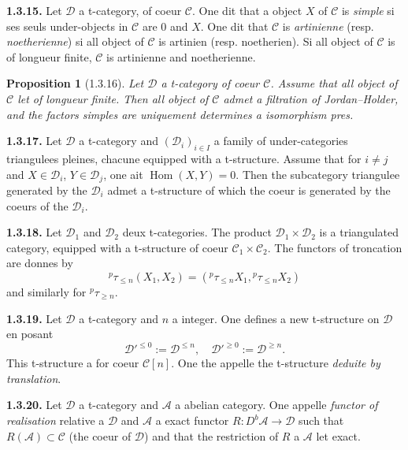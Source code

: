 \documentclass[12pt,a4paper]{article}
\theoremstyle{plain}
\newtheorem{proposition}[theorem]{Proposition}
\theoremstyle{definition}
\theoremstyle{remark}
\DeclareMathOperator{\Hom}{Hom}
\newcommand{\cA}{\mathcal{A}}
\newcommand{\cC}{\mathcal{C}}
\newcommand{\cD}{\mathcal{D}}
\begin{document}
\smallskip

\noindent
\textbf{1.3.15.} Let $\cD$ a t-category, of coeur $\cC$. One dit that a object $X$ of $\cC$ is \emph{simple} si ses seuls under-objects in $\cC$ are $0$ and $X$. One dit that $\cC$ is \emph{artinienne} (resp. \emph{noetherienne}) si all object of $\cC$ is artinien (resp. noetherien). Si all object of $\cC$ is of longueur finite, $\cC$ is artinienne and noetherienne.

\smallskip

\begin{proposition}[1.3.16]
Let $\cD$ a t-category of coeur $\cC$. Assume that all object of $\cC$ let of longueur finite. Then all object of $\cC$ admet a filtration of Jordan--Holder, and the factors simples are uniquement determines a isomorphism pres.
\end{proposition}

\smallskip

\noindent
\textbf{1.3.17.} Let $\cD$ a t-category and $(\cD_{i})_{i \in I}$ a family of under-categories triangulees pleines, chacune equipped with a t-structure. Assume that for $i \neq j$ and $X \in \cD_{i}$, $Y \in \cD_{j}$, one ait $\Hom(X, Y) = 0$. Then the subcategory triangulee generated by the $\cD_{i}$ admet a t-structure of which the coeur is generated by the coeurs of the $\cD_{i}$.

\smallskip

\noindent
\textbf{1.3.18.} Let $\cD_{1}$ and $\cD_{2}$ deux t-categories. The product $\cD_{1} \times \cD_{2}$ is a triangulated category, equipped with a t-structure of coeur $\cC_{1} \times \cC_{2}$. The functors of troncation are donnes by
\[
{}^{p}\tau_{\leq n}(X_{1}, X_{2}) = ({}^{p}\tau_{\leq n}X_{1}, {}^{p}\tau_{\leq n}X_{2})
\]
and similarly for ${}^{p}\tau_{\geq n}$.

\smallskip

\noindent
\textbf{1.3.19.} Let $\cD$ a t-category and $n$ a integer. One defines a new t-structure on $\cD$ en posant
\[
\cD'^{\leq 0} := \cD^{\leq n}, \quad \cD'^{\geq 0} := \cD^{\geq n}.
\]
This t-structure a for coeur $\cC[n]$. One the appelle the t-structure \emph{deduite by translation}.

\smallskip

\noindent
\textbf{1.3.20.} Let $\cD$ a t-category and $\cA$ a abelian category. One appelle \emph{functor of realisation} relative a $\cD$ and $\cA$ a exact functor $R : D^{b}\cA \to \cD$ such that $R(\cA) \subset \cC$ (the coeur of $\cD$) and that the restriction of $R$ a $\cA$ let exact.
\end{document}
